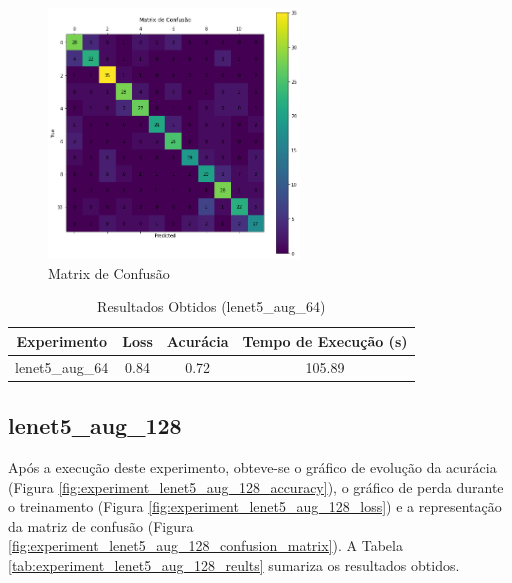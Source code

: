 \documentclass[12pt]{article}
\begin{document}
\begin{figure}[!htb]
  \centering
  \includegraphics[width=18em]{experiments/lenet5_aug_64/confusion_matrix.png}
  \caption{Matrix de Confusão}
  \label{fig:experiment_lenet5_aug_64_confusion_matrix}
\end{figure}

\begin{table}[!htb]
  \centering
  \begin{tabular}{|c|c|c|c|}
    \hline
    \textbf{Experimento} & \textbf{Loss} & \textbf{Acurácia} & \textbf{Tempo de Execução (s)} \\ \hline
    lenet5\_aug\_64      & 0.84          & 0.72              & 105.89                         \\ \hline
  \end{tabular}
  \caption{Resultados Obtidos (lenet5\_aug\_64)}
  \label{tab:experiment_lenet5_aug_64_reults}
\end{table}

\newpage

\subsection{lenet5\_aug\_128}

Após a execução deste experimento, obteve-se o gráfico de evolução da acurácia (Figura \ref{fig:experiment_lenet5_aug_128_accuracy}), o gráfico de perda durante o treinamento (Figura \ref{fig:experiment_lenet5_aug_128_loss}) e a representação da matriz de confusão (Figura \ref{fig:experiment_lenet5_aug_128_confusion_matrix}). A Tabela \ref{tab:experiment_lenet5_aug_128_reults} sumariza os resultados obtidos.
\end{document}
